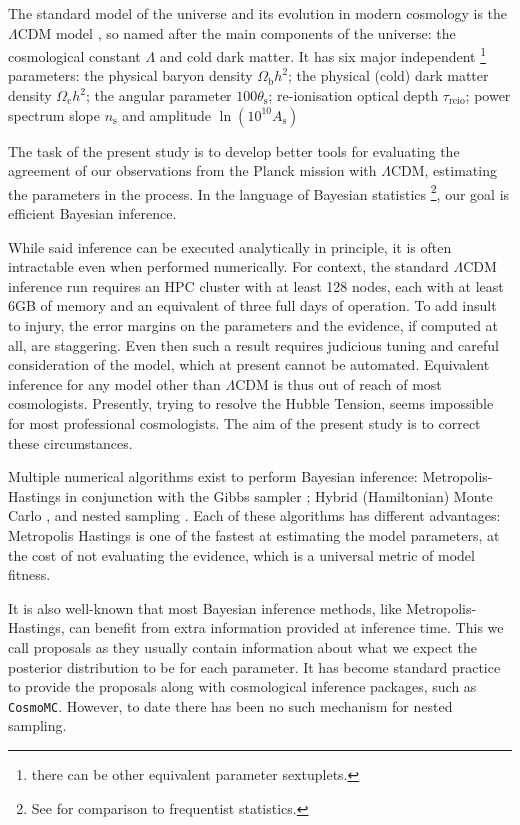\documentclass[draft,usenatbib]{mnras}
\begin{document}
The standard model of the universe and its evolution in modern
cosmology is the \(\Lambda\)CDM model \citep{Condon2018}, so named
after the main components of the universe: the cosmological constant
\(\Lambda\) and cold dark matter. It has six major \citep{Condon2018}
independent \footnote{there can be other equivalent parameter
sextuplets.} parameters: the physical baryon density
\(\Omega_\mathrm{b}h^{2}\); the physical (cold) dark matter density
\(\Omega_\mathrm{c}h^{2}\); the angular parameter
\(100\theta_\mathrm{s}\); re-ionisation optical depth
\(\tau_\text{reio}\); power spectrum slope \(n_\mathrm{s}\) and
amplitude \(\ln (10^{10}A_\mathrm{s})\) \cite{Cosmology}

The task of the present study is to develop better tools for
evaluating the agreement of our observations from the Planck mission
with \(\Lambda\)CDM, estimating the parameters in the process. In
the language of Bayesian statistics \footnote{See \cite{xkcd} for
comparison to frequentist statistics.}, our goal is efficient
Bayesian inference.

While said inference can be executed analytically in principle, it
is often intractable even when performed numerically. For context,
the standard \(\Lambda\)CDM inference run requires an HPC cluster
with at least 128 nodes, each with at least 6GB of memory and an
equivalent of three full days of operation. To add insult to injury,
the error margins on the parameters and the evidence, if computed at
all, are staggering.  Even then such a result requires judicious
tuning and careful consideration of the model, which at present
cannot be automated. Equivalent inference for any model other than
\(\Lambda\)CDM is thus out of reach of most cosmologists. Presently,
trying to resolve the Hubble Tension, \cite{tension} seems
impossible for most professional cosmologists. The aim of the
present study is to correct these circumstances.

Multiple numerical algorithms exist to perform Bayesian inference:
Metropolis-Hastings \citep{Metropolis} in conjunction with the Gibbs
sampler \citep{Metropolis-Hastings-Gibbs}; Hybrid (Hamiltonian)
Monte Carlo \citep{1701.02434,Duane_1987}, and nested sampling
\citep{Skilling2006}. Each of these algorithms has different
advantages: Metropolis Hastings is one of the fastest at estimating
the model parameters, at the cost of not evaluating the evidence,
which is a universal metric of model fitness.

It is also well-known that most Bayesian inference methods, like
Metropolis-Hastings, can benefit from extra information provided at
inference time. This we call proposals as they usually contain
information about what we expect the posterior distribution to be
for each parameter. It has become standard practice to provide the
proposals along with cosmological inference packages, such as
\texttt{CosmoMC}. However, to date there has been no such mechanism for
nested sampling.
\end{document}
